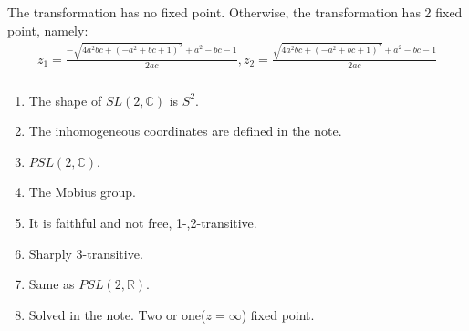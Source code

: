 \documentclass[]{ctexart}
\begin{document}
			The transformation has no fixed point. Otherwise, the transformation has 2 fixed point, namely:
				\begin{equation*}
				\begin{aligned}
					z_1=\frac{-\sqrt{4 a^2 b c+\left(-a^2+b c+1\right)^2}+a^2-b c-1}{2 a c},z_2=\frac{\sqrt{4 a^2 b c+\left(-a^2+b c+1\right)^2}+a^2-b c-1}{2 a c}
				\end{aligned}
				\end{equation*}
			
			\subsubsection{}
				\begin{enumerate}
					\item The shape of $SL(2,\mathbb{C})$ is $S^2$. 
					\item The inhomogeneous coordinates are defined in the note.
					\item $PSL(2,\mathbb{C})$.
					\item The Mobius group.
					\item It is faithful and not free, 1-,2-transitive.
					\item Sharply 3-transitive.
					\item Same as $PSL(2,\mathbb{R})$.
					\item Solved in the note. Two or one($z=\infty$) fixed point. 
				\end{enumerate}
		
\end{document}
